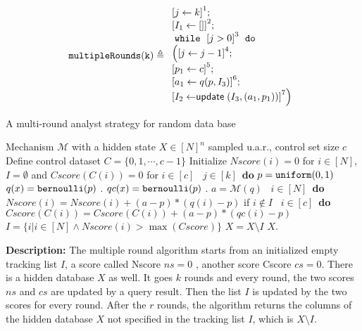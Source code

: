 \begin{example}
%
\[
%
\kw{multipleRounds(k)} \triangleq
\begin{array}{l}
     \left[j \leftarrow k \right]^1 ; \\
    \left[I_1 \leftarrow [] \right]^2; \\
    \ewhile ~ \clabel{j > 0}^{3} ~ \edo ~ \\
    \Big(
    \clabel{\assign{j}{j-1}}^{4} ;\\
    \left[p_1 \leftarrow c \right]^5; \\
    \left[ a_1 \leftarrow q (p, I_3) \right]^6;\\
    \left[I_2 \leftarrow \mathrel{\mathsf{update}} ( {I_3}, (a_1, p_1))  \right]^7
    \Big) 
\end{array}
\]
%
\begin{algorithm}
\footnotesize
\caption{A multi-round analyst strategy for random data base \cite{dwork2015preserving}}
\label{alg:multiRound}
\begin{algorithmic}
\REQUIRE Mechanism $\mathcal{M}$ with a hidden state $X\in [N]^{n}$ sampled u.a.r., control set size $c$
\STATE Define control dataset $C = \{0,1, \cdots, c - 1\}$
\STATE Initialize $Nscore(i) = 0$ for $i \in [N]$, $I = \emptyset$ and $Cscore(C(i)) = 0$ for $i \in [c]$
\ $j\in [k]$\ {\bf do} 
\STATE {} $p=\mathtt{uniform}(0,1)$ 
\STATE {} $q (x) = \mathtt{bernoulli} ( p )$ .
\STATE {} $qc (x) = \mathtt{bernoulli} ( p )$ .
\STATE {} $a = \mathcal{M}(q)$ 
\STATE {}\ $i \in [N]$\ {\bf do}
\STATE \qquad \qquad $Nscore(i) = Nscore(i) + (a - p)*(q (i) - p)$ if $i \notin I$
\STATE {}\ $i \in [c]$\ {\bf do}
\STATE \qquad \qquad $Cscore(C(i)) = Cscore(C(i)) + (a - p)*(qc (i) - p)$
\STATE {} $I = \{i | i\in [N] \land Nscore(i) > \max(Cscore)\}$
\STATE {} $X = X \setminus I$ 
\RETURN $X$.
\end{algorithmic}
\end{algorithm}
%
%
\end{example}
\textbf{Description:}
The multiple round algorithm starts from an initialized empty tracking list $I$, a score called Nscore $ns=0$ , another score Cscore $cs=0$. There is a hidden database $X$ as well.
It goes $k$ rounds and every round, the two scores $ns$ and $cs$ are updated by a query result. Then the list $I$ is updated by the two scores for every round. After the $r$ rounds, the algorithm returns the columns of the hidden database $X$ not specified in the tracking list $I$, which is $X\setminus I$. 

